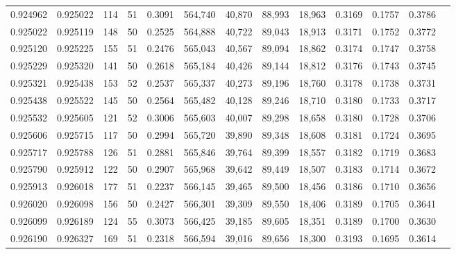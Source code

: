 \begin{tabular}{rrrrrrrrrrrrr}
0.924962 & 0.925022 &   114 &  51 &                                     0.3091 & 564,740 &  40,870 &  88,993 &  18,963 & 0.3169 & 0.1757 & 0.3786 \\
0.925022 & 0.925119 &   148 &  50 &                                     0.2525 & 564,888 &  40,722 &  89,043 &  18,913 & 0.3171 & 0.1752 & 0.3772 \\
0.925120 & 0.925225 &   155 &  51 &                                     0.2476 & 565,043 &  40,567 &  89,094 &  18,862 & 0.3174 & 0.1747 & 0.3758 \\
0.925229 & 0.925320 &   141 &  50 &                                     0.2618 & 565,184 &  40,426 &  89,144 &  18,812 & 0.3176 & 0.1743 & 0.3745 \\
0.925321 & 0.925438 &   153 &  52 &                                     0.2537 & 565,337 &  40,273 &  89,196 &  18,760 & 0.3178 & 0.1738 & 0.3731 \\
0.925438 & 0.925522 &   145 &  50 &                                     0.2564 & 565,482 &  40,128 &  89,246 &  18,710 & 0.3180 & 0.1733 & 0.3717 \\
0.925532 & 0.925605 &   121 &  52 &                                     0.3006 & 565,603 &  40,007 &  89,298 &  18,658 & 0.3180 & 0.1728 & 0.3706 \\
0.925606 & 0.925715 &   117 &  50 &                                     0.2994 & 565,720 &  39,890 &  89,348 &  18,608 & 0.3181 & 0.1724 & 0.3695 \\
0.925717 & 0.925788 &   126 &  51 &                                     0.2881 & 565,846 &  39,764 &  89,399 &  18,557 & 0.3182 & 0.1719 & 0.3683 \\
0.925790 & 0.925912 &   122 &  50 &                                     0.2907 & 565,968 &  39,642 &  89,449 &  18,507 & 0.3183 & 0.1714 & 0.3672 \\
0.925913 & 0.926018 &   177 &  51 &                                     0.2237 & 566,145 &  39,465 &  89,500 &  18,456 & 0.3186 & 0.1710 & 0.3656 \\
0.926020 & 0.926098 &   156 &  50 &                                     0.2427 & 566,301 &  39,309 &  89,550 &  18,406 & 0.3189 & 0.1705 & 0.3641 \\
0.926099 & 0.926189 &   124 &  55 &                                     0.3073 & 566,425 &  39,185 &  89,605 &  18,351 & 0.3189 & 0.1700 & 0.3630 \\
0.926190 & 0.926327 &   169 &  51 &                                     0.2318 & 566,594 &  39,016 &  89,656 &  18,300 & 0.3193 & 0.1695 & 0.3614 \\

\end{tabular}
